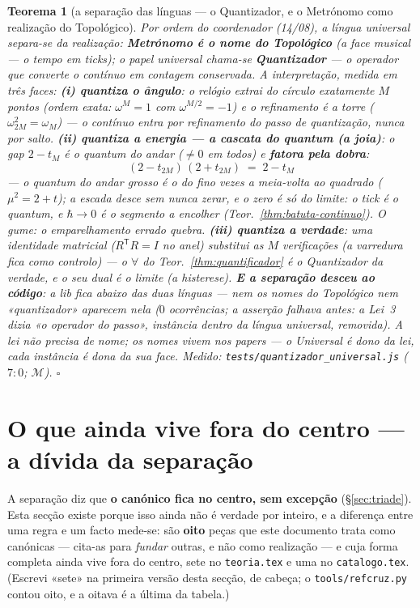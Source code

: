 \documentclass[11pt,a4paper]{article}
\newtheorem{teorema}{Teorema}
\newcommand{\code}[1]{\texttt{\small #1}}
\begin{document}
\begin{teorema}[a separação das línguas --- o Quantizador, e o
Metrónomo como realização do Topológico]\label{thm:quantizador-universal}
Por ordem do coordenador (14/08), a língua universal separa-se da
realização: \textbf{Metrónomo é o nome do Topológico} (a face musical ---
o tempo em ticks); o papel universal chama-se \textbf{Quantizador}
--- \emph{o operador que converte o contínuo em contagem conservada}.
A interpretação, medida em três faces:
\textbf{(i) quantiza o ângulo}: o relógio extrai do círculo
exatamente $M$ pontos (ordem \emph{exata}: $\omega^{M}=1$ com
$\omega^{M/2}=-1$) e o refinamento é a torre
($\omega_{2M}^{2}=\omega_{M}$) --- o contínuo entra por refinamento
do passo de quantização, nunca por salto.
\textbf{(ii) quantiza a energia --- a cascata do quantum (a joia)}:
o gap $2-t_{M}$ é o \emph{quantum do andar} ($\neq0$ em todos) e
\textbf{fatora pela dobra}:
\[
\boxed{\;(2-t_{2M})\,(2+t_{2M})\;=\;2-t_{M}\;}
\]
--- o quantum do andar grosso é o do fino vezes a meia-volta ao
quadrado ($\mu^{2}=2+t$); a escada desce sem nunca zerar, e o zero é
só do limite: \emph{o tick é o quantum, e $\hbar\to0$ é o segmento a
encolher} (Teor.~\ref{thm:batuta-continuo}). O gume: o
emparelhamento errado quebra.
\textbf{(iii) quantiza a verdade}: \emph{uma} identidade matricial
($R^{\mathsf{T}}R=I$ no anel) substitui as $M$ verificações (a
varredura fica como controlo) --- o $\forall$ do
Teor.~\ref{thm:quantificador} é o Quantizador da verdade, e o seu
dual é o limite (a histerese).
\textbf{E a separação desceu ao código}: a lib fica \emph{abaixo}
das duas línguas --- nem os nomes do Topológico nem «quantizador»
aparecem nela ($0$ ocorrências; a asserção \emph{falhava} antes: a
Lei~3 dizia «o operador do passo», instância dentro da língua universal,
removida). A lei não precisa de nome; os nomes vivem nos papers ---
o Universal é dono da lei, cada instância é dona da sua face.
\emph{Medido:} \code{tests/quantizador\_universal.js} ($7{:}0$;
$\mathcal{M}$).
$\square$
\end{teorema}

\section{O que ainda vive fora do centro --- a dívida da separação}\label{sec:dividas}

A separação diz que \textbf{o canónico fica no centro, sem excepção} (\S\ref{sec:triade}).
Esta secção existe porque isso ainda não é verdade por inteiro, e a diferença entre uma
regra e um facto mede-se: são \textbf{oito} peças que este documento trata como canónicas
--- cita-as para \emph{fundar} outras, e não como realização --- e cuja forma completa
ainda vive fora do centro, sete no \code{teoria.tex} e uma no \code{catalogo.tex}.
(Escrevi «sete» na primeira versão desta secção, de cabeça; o \code{tools/refcruz.py}
contou oito, e a oitava é a última da tabela.)
\end{document}
